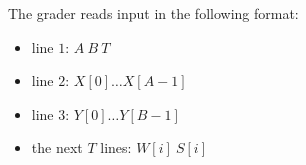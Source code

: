 The grader reads input in the following format:
\begin{itemize}
\item line $1$: $A\ B\ T$
\item line $2$: $X[0]\dots X[A­ - 1]$
\item line $3$: $Y[0]\dots Y[B- ­1]$
\item the next $T$ lines: $W[i]\ S[i]$
\end{itemize}

